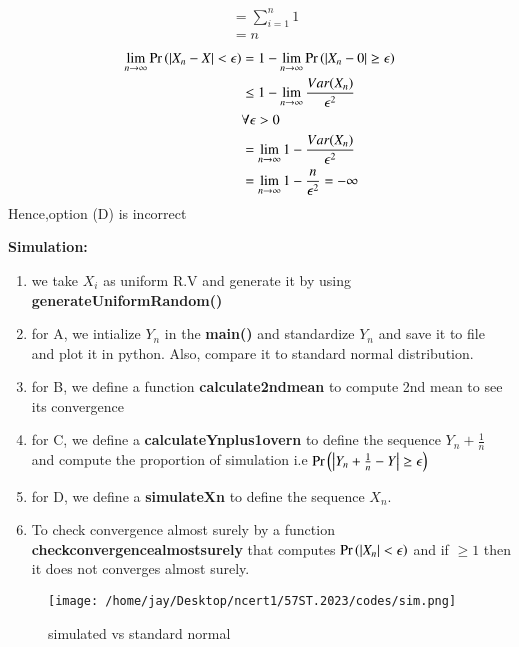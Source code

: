 \documentclass[journal,12pt,Twocolumn]{IEEEtran}
\theoremstyle{remark}
\begin{document}
\begin{enumerate}[label=(\Alph*)]
\begin{align}
&= \sum_{i=1}^{n} 1\\
&= n
\end{align}
\begin{align}
\lim_{n \to \infty} \Pr\left(|X_n - X| <  \epsilon\right)
&=1 - \lim_{n \to \infty} \Pr\left(|X_n-0| \geq  \epsilon\right) \\ 
&\leq 1 - \lim_{n \to \infty} \frac{Var(X_n)}{\epsilon^2} \\
& \forall \epsilon > 0 \\
&=\lim_{n \to \infty} 1 - \frac{Var(X_n)}{\epsilon^2} \\
&=\lim_{n \to \infty} 1 - \frac{n}{\epsilon^2} = -\infty
\end{align} 
Hence,option (D) is incorrect
\end{enumerate}
\textbf{Simulation:}
\begin{enumerate}
\item we take $X_i$ as uniform R.V and generate it by using \textbf{generateUniformRandom()}
\item for A, we intialize $Y_n$ in the \textbf{main()} and standardize $Y_n$ and save it to file and plot it in python. Also, compare it to standard normal distribution.
\item for B, we define a function \textbf{calculate2ndmean} to compute 2nd mean to see its convergence
\item for C, we define a \textbf{calculateYnplus1overn} to define the sequence $Y_n + \frac{1}{n}$ and compute the proportion of simulation i.e $\Pr\left(\left|Y_n +\frac{1}{n}-Y\right| \geq  \epsilon\right)$
\item for D, we define a \textbf{simulateXn} to define the sequence $X_n$. \item To check convergence almost surely by a function \textbf{checkconvergencealmostsurely} that computes $\Pr\left(|X_n| < \epsilon\right)$ and if $ \geq 1 $ then it does not converges almost surely.
\end{enumerate}
\begin{figure}[!ht]
\centering
\texttt{[image: /home/jay/Desktop/ncert1/57ST.2023/codes/sim.png]}
\caption{simulated vs standard normal }
\label{fig:9.3.6/F/Fig1}
\end{figure}
\end{document}

